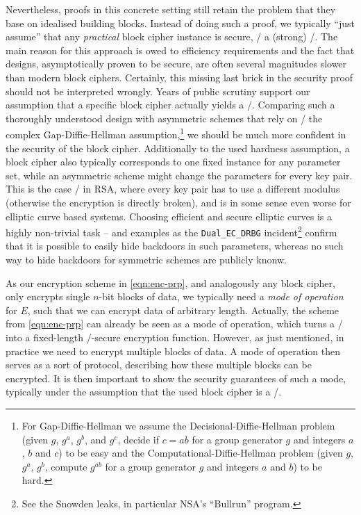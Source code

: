 Nevertheless, proofs in this concrete setting still retain the problem that they base on idealised building blocks.
Instead of doing such a proof, we typically \enquote{just assume} that any \emph{practical} block cipher instance is secure, \ie/ a (strong) \PRP/.
The main reason for this approach is owed to efficiency requirements and the fact that designs, asymptotically proven to be secure, are often several magnitudes slower than modern block ciphers.
Certainly, this missing last brick in the security proof should not be interpreted wrongly.
Years of public scrutiny support our assumption that a specific block cipher actually yields a \PRP/.
Comparing such a thoroughly understood design with asymmetric schemes that rely on \eg/ the complex Gap-Diffie-Hellman assumption,\footnote{%
    For Gap-Diffie-Hellman we assume the Decisional-Diffie-Hellman problem (given $g$, $g^a$, $g^b$, and $g^c$, decide if $c=ab$ for a group generator $g$ and integers $a$, $b$ and $c$) to be easy and the Computational-Diffie-Hellman problem (given $g$, $g^a$, $g^b$, compute $g^{ab}$ for a group generator $g$ and integers $a$ and $b$) to be hard.
}
we should be much more confident in the security of the block cipher.
Additionally to the used hardness assumption, a block cipher also typically corresponds to one fixed instance for any parameter set, while an asymmetric scheme might change the parameters for every key pair.
This is the case \eg/ in RSA, where every key pair has to use a different modulus (otherwise the encryption is directly broken), and is in some sense even worse for elliptic curve based systems.
Choosing efficient and secure elliptic curves is a highly non-trivial task -- and examples as the \texttt{Dual\_EC\_DRBG} incident\footnote{%
    See the Snowden leaks, in particular NSA's \enquote{Bullrun} program.
} confirm that it is possible to easily hide backdoors in such parameters, whereas no such way to hide backdoors for symmetric schemes are publicly knonw.

As our encryption scheme in \cref{eqn:enc-prp}, and analogously any block cipher, only encrypts single $n$-bit blocks of data, we typically need a \emph{mode of operation} for $E$, such that we can encrypt data of arbitrary length.
Actually, the scheme from \cref{eqn:enc-prp} can already be seen as a mode of operation, which turns a \PRP/ into a fixed-length \CPA/-secure encryption function.
However, as just mentioned, in practice we need to encrypt multiple blocks of data.
A mode of operation then serves as a sort of protocol, describing how these multiple blocks can be encrypted.
It is then important to show the security guarantees of such a mode, typically under the assumption that the used block cipher is a \PRP/.

